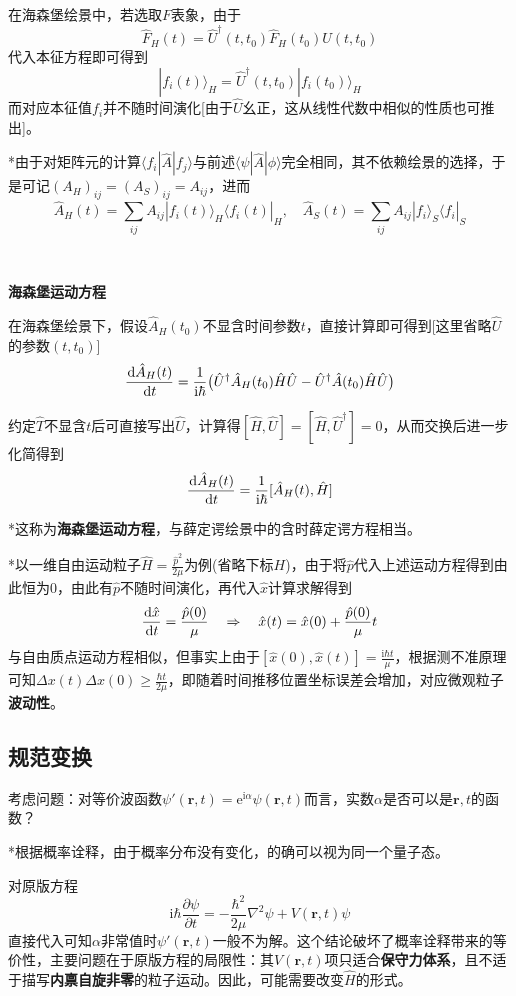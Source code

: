 \documentclass[a4paper,UTF8,fontset=windows]{ctexart}
\newcommand*{\dr}{\hspace{0.07em}\mathrm{d}}
\newcommand*{\ir}{\mathrm{i}}
\newcommand*{\er}{\mathrm{e}}
\newcommand*{\ket}[1]{|#1\rangle}
\newcommand*{\bra}[1]{\langle#1|}
\newcommand*{\blk}[3]{\langle#1|#2|#3\rangle}
\newcommand*{\br}{\mathbf{r}}
\begin{document}
在海森堡绘景中，若选取$F$表象，由于
$$\hat{F}_H(t)=\hat{U}^\dagger(t,t_0)\hat{F}_H(t_0)\hat{U}(t,t_0)$$
代入本征方程即可得到
$$\ket{f_i(t)}_H=\hat{U}^\dagger(t,t_0)\ket{f_i(t_0)}_H$$
而对应本征值$f_i$并不随时间演化[由于$\hat{U}$幺正，这从线性代数中相似的性质也可推出]。

*由于对矩阵元的计算$\blk{f_i}{\hat{A}}{f_j}$与前述$\blk{\psi}{\hat{A}}{\phi}$完全相同，其不依赖绘景的选择，于是可记$(A_H)_{ij}=(A_S)_{ij}=A_{ij}$，进而
$$\hat{A}_H(t)=\sum_{ij}A_{ij}\ket{f_i(t)}_H\bra{f_i(t)}_H,\quad\hat{A}_S(t)=\sum_{ij}A_{ij}\ket{f_i}_S\bra{f_i}_S$$

\

\textbf{海森堡运动方程}

在海森堡绘景下，假设$\hat{A}_H(t_0)$不显含时间参数$t$，直接计算即可得到[这里省略$\hat{U}$的参数$(t,t_0)$]
$$\frac{\dr\hat{A}_H(t)}{\dr t}=\frac{1}{\ir\hbar}\big(\hat{U}^\dagger\hat{A}_H(t_0)\hat{H}\hat{U}-\hat{U}^\dagger\hat{A}(t_0)\hat{H}\hat{U}\big)$$

约定$\hat{T}$不显含$t$后可直接写出$\hat{U}$，计算得$[\hat{H},\hat{U}]=[\hat{H},\hat{U}^\dagger]=0$，从而交换后进一步化简得到
$$\frac{\dr\hat{A}_H(t)}{\dr t}=\frac{1}{\ir\hbar}[\hat{A}_H(t),\hat{H}]$$

*这称为\textbf{海森堡运动方程}，与薛定谔绘景中的含时薛定谔方程相当。

*以一维自由运动粒子$\hat{H}=\frac{\hat{p}^2}{2\mu}$为例(省略下标$H$)，由于将$\hat{p}$代入上述运动方程得到由此恒为0，由此有$\hat{p}$不随时间演化，再代入$\hat{x}$计算求解得到
$$\frac{\dr\hat{x}}{\dr t}=\frac{\hat{p}(0)}{\mu}\quad\Rightarrow\quad\hat{x}(t)=\hat{x}(0)+\frac{\hat{p}(0)}{\mu}t$$
与自由质点运动方程相似，但事实上由于$[\hat{x}(0),\hat{x}(t)]=\frac{\ir\hbar t}{\mu}$，根据测不准原理可知$\Delta x(t)\Delta x(0)\ge\frac{\hbar t}{2\mu}$，即随着时间推移位置坐标误差会增加，对应微观粒子\textbf{波动性}。

\subsection{规范变换}
考虑问题：对等价波函数$\psi'(\br,t)=\er^{\ir\alpha}\psi(\br,t)$而言，实数$\alpha$是否可以是$\br,t$的函数？

*根据概率诠释，由于概率分布没有变化，的确可以视为同一个量子态。

对原版方程
$$\ir\hbar\frac{\partial\psi}{\partial t}=-\frac{\hbar^2}{2\mu}\nabla^2\psi+V(\br,t)\psi$$
直接代入可知$\alpha$非常值时$\psi'(\br,t)$一般不为解。这个结论破坏了概率诠释带来的等价性，主要问题在于原版方程的局限性：其$V(\br,t)$项只适合\textbf{保守力体系}，且不适于描写\textbf{内禀自旋非零}的粒子运动。因此，可能需要改变$\hat{H}$的形式。
\end{document}
